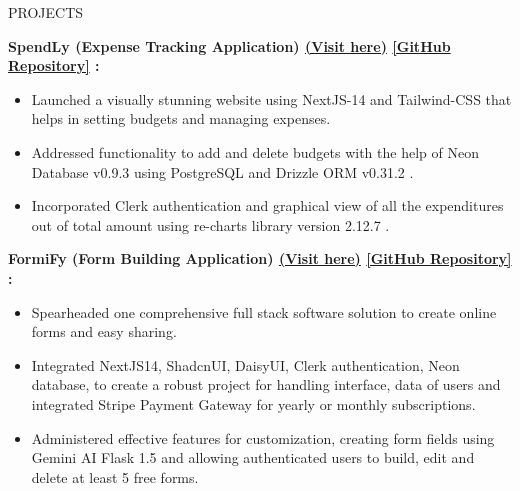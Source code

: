 \documentclass{resume} %
\begin{document}
\begin{rSection}{PROJECTS}
   \vspace{-1.00em}

     \item \textbf{SpendLy (Expense Tracking Application) 
    {\href{https://spendly-beige.vercel.app/}{(Visit here)}}
    {\href{https://github.com/arkapg211002/Spendly}{[GitHub Repository]}} :} 
    \vspace{-0.6em}
    \begin{itemize}
    \setlength\itemsep{-0.6em}
    \item Launched a visually stunning website using NextJS-14 and Tailwind-CSS that helps in setting budgets and managing expenses.
    \item Addressed functionality to add and delete budgets with the help of Neon Database v0.9.3 using PostgreSQL and Drizzle ORM v0.31.2 .
    \item Incorporated Clerk authentication and graphical view of all the expenditures out of total amount using re-charts library version 2.12.7 .
    \end{itemize}
    
    \item \textbf{FormiFy (Form Building Application)
    {\href{https://formify-drab.vercel.app/}{(Visit here)}}
    {\href{https://github.com/arkapg211002/Formify}{[GitHub Repository]}} :}
    \vspace{-0.6em}
    \begin{itemize}
    \setlength\itemsep{-0.6em}
     \item Spearheaded one comprehensive full stack software solution to create online forms and easy sharing.
    \item Integrated NextJS14, ShadcnUI, DaisyUI, Clerk authentication, Neon database, to create a robust project for handling interface, data of users and integrated Stripe Payment Gateway for yearly or monthly subscriptions.
    \item Administered effective features for customization, creating form fields using Gemini AI Flask 1.5 and allowing authenticated users to build, edit and delete at least 5 free forms. 
    \end{itemize}
    

\end{rSection}
\end{document}
